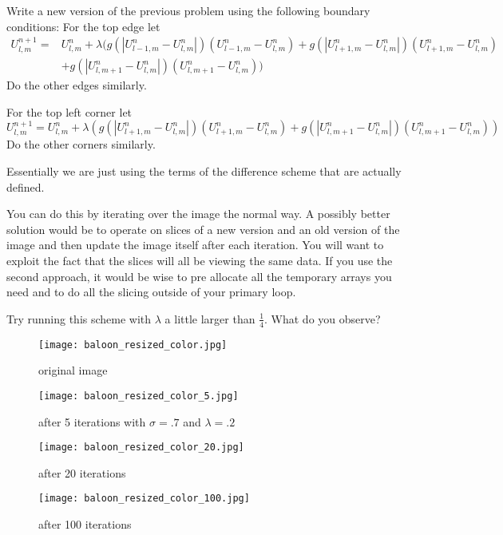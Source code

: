 \begin{problem}
Write a new version of the previous problem using the following boundary conditions:
For the top edge let 
\begin{equation*}
\begin{split}
U_{l,m}^{n+1} =& U_{l,m}^n + \lambda (g(|U_{l-1,m}^n - U_{l,m}^n|)(U_{l-1,m}^n - U_{l,m}^n) + g(|U_{l+1,m}^n - U_{l,m}^n|)(U_{l+1,m}^n - U_{l,m}^n) \\
 &+ g(|U_{l,m+1}^n - U_{l,m}^n|)(U_{l,m+1}^n - U_{l,m}^n))
\end{split}
\end{equation*}
Do the other edges similarly.

For the top left corner let
\begin{equation*}
U_{l,m}^{n+1} = U_{l,m}^n + \lambda (g(|U_{l+1,m}^n - U_{l,m}^n|)(U_{l+1,m}^n - U_{l,m}^n) + g(|U_{l,m+1}^n - U_{l,m}^n|)(U_{l,m+1}^n - U_{l,m}^n))
\end{equation*}
Do the other corners similarly.

Essentially we are just using the terms of the difference scheme that are actually defined.

You can do this by iterating over the image the normal way.
A possibly better solution would be to operate on slices of a new version and an old version of the image and then update the image itself after each iteration.
You will want to exploit the fact that the slices will all be viewing the same data.
If you use the second approach, it would be wise to pre allocate all the temporary arrays you need and to do all the slicing outside of your primary loop.

Try running this scheme with $\lambda$ a little larger than $\frac{1}{4}$. What do you observe?
\end{problem}

\newpage
\vfill
\begin{figure}[ht]
\begin{minipage}[b]{0.45\linewidth}
\centering
\texttt{[image: baloon\_resized\_color.jpg]}
\caption*{original image}
\end{minipage}
\hspace{0.5cm}
\begin{minipage}[b]{0.45\linewidth}
\centering
\texttt{[image: baloon\_resized\_color\_5.jpg]}
\caption*{after 5 iterations with $\sigma = .7$ and $\lambda = .2$}
\end{minipage}
\begin{minipage}[b]{0.45\linewidth}
\centering
\texttt{[image: baloon\_resized\_color\_20.jpg]}
\caption*{after 20 iterations}
\end{minipage}
\hspace{0.5cm}
\begin{minipage}[b]{0.45\linewidth}
\centering
\texttt{[image: baloon\_resized\_color\_100.jpg]}
\caption*{after 100 iterations}
\end{minipage}
\end{figure}
\vfill
\clearpage

